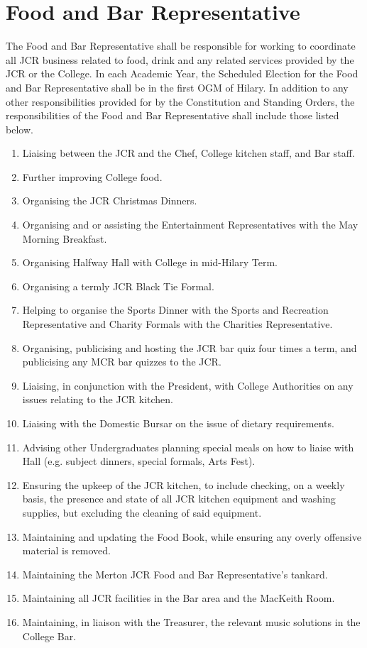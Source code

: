 \section{Food and Bar Representative}
\npara The Food and Bar Representative shall be responsible for working to coordinate all JCR business related to food, drink and any related services provided by the JCR or the College.
\npara In each Academic Year, the Scheduled Election for the Food and Bar Representative shall be in the first OGM of Hilary.
\npara In addition to any other responsibilities provided for by the Constitution and Standing Orders, the responsibilities of the Food and Bar Representative shall include those listed below.
\begin{enumerate}
	\item Liaising between the JCR and the Chef, College kitchen staff, and Bar staff. 
	\item Further improving College food. 
	\item Organising the JCR Christmas Dinners.
	\item Organising and or assisting the Entertainment Representatives with the May Morning Breakfast. 
	\item Organising Halfway Hall with College in mid-Hilary Term.
	\item Organising a termly JCR Black Tie Formal.
	\item Helping to organise the Sports Dinner with the Sports and Recreation Representative and Charity Formals with the Charities Representative.
	\item Organising, publicising and hosting the JCR bar quiz four times a term, and publicising any MCR bar quizzes to the JCR.
	\item Liaising, in conjunction with the President, with College Authorities on any issues relating to the JCR kitchen. 
	\item Liaising with the Domestic Bursar on the issue of dietary requirements.
	\item Advising other Undergraduates planning special meals on how to liaise with Hall (e.g. subject dinners, special formals, Arts Fest).
	\item Ensuring the upkeep of the JCR kitchen, to include checking, on a weekly basis, the presence and state of all JCR kitchen equipment and washing supplies, but excluding the cleaning of said equipment. 
	\item Maintaining and updating the Food Book, while ensuring any overly offensive material is removed.
	\item Maintaining the Merton JCR Food and Bar Representative's tankard.
	\item Maintaining all JCR facilities in the Bar area and the MacKeith Room.
	\item Maintaining, in liaison with the Treasurer, the relevant music solutions in the College Bar.
\end{enumerate}

